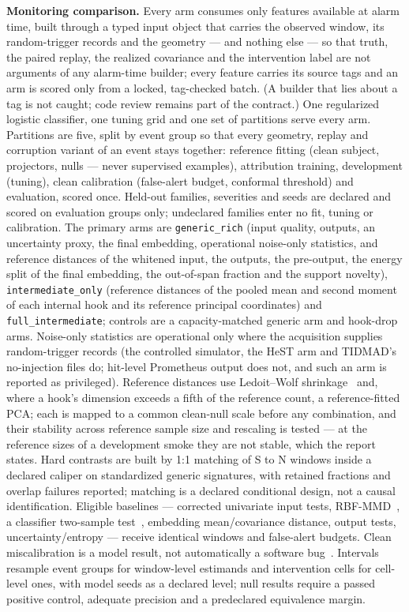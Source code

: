 \documentclass[10pt,twocolumn]{extarticle}
\begin{document}
\textbf{Monitoring comparison.} Every arm consumes only features available at
alarm time, built through a typed input object that carries the observed
window, its random-trigger records and the geometry --- and nothing else ---
so that truth, the paired replay, the realized covariance and the intervention
label are not arguments of any alarm-time builder; every feature carries its
source tags and an arm is scored only from a locked, tag-checked batch. (A
builder that lies about a tag is not caught; code review remains part of the
contract.) One regularized logistic classifier, one tuning grid and one set
of partitions serve every arm. Partitions are five, split by event group so
that every geometry, replay and corruption variant of an event stays
together: reference fitting (clean subject, projectors, nulls --- never
supervised examples), attribution training, development (tuning), clean
calibration (false-alert budget, conformal threshold) and evaluation, scored
once. Held-out families, severities and seeds are declared and scored on
evaluation groups only; undeclared families enter no fit, tuning or
calibration. The primary arms are \texttt{generic\_rich} (input quality,
outputs, an uncertainty proxy, the final embedding, operational noise-only
statistics, and reference distances of the whitened input, the outputs, the
pre-output, the energy split of the final embedding, the out-of-span fraction
and the support novelty), \texttt{intermediate\_only} (reference distances of
the pooled mean and second moment of each internal hook and its reference
principal coordinates) and \texttt{full\_intermediate}; controls are a
capacity-matched generic arm and hook-drop arms. Noise-only statistics are
operational only where the acquisition supplies random-trigger records (the
controlled simulator, the HeST arm and TIDMAD's no-injection files do;
hit-level Prometheus output does not, and such an arm is reported as
privileged). Reference distances use Ledoit--Wolf shrinkage~\cite{ledoitwolf2004} and, where a hook's
dimension exceeds a fifth of the reference count, a reference-fitted PCA; each
is mapped to a common clean-null scale before any combination, and their
stability across reference sample size and rescaling is tested --- at the
reference sizes of a development smoke they are not stable, which the report
states. Hard contrasts are built by 1:1 matching of S to N windows inside a
declared caliper on standardized generic signatures, with retained fractions
and overlap failures reported; matching is a declared conditional design, not
a causal identification. Eligible baselines --- corrected univariate input
tests, RBF-MMD~\cite{gretton2012}, a classifier two-sample
test~\cite{lopezpaz2017}, embedding mean/covariance distance, output tests,
uncertainty/entropy --- receive identical windows and false-alert budgets.
Clean miscalibration is a model result, not automatically a software
bug~\cite{guo2017}. Intervals resample event groups for window-level
estimands and intervention cells for cell-level ones, with model seeds as a
declared level; null results require a passed positive control, adequate
precision and a predeclared equivalence margin.
\end{document}
